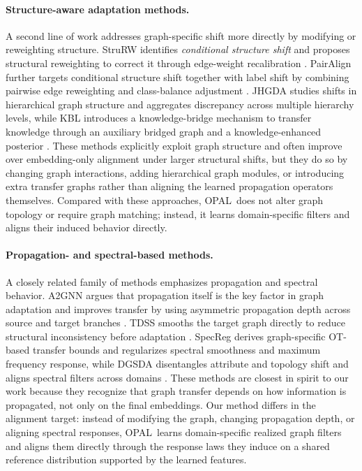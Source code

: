 \documentclass[runningheads]{llncs}
\newcommand{\model}{OPAL}
\begin{document}
\paragraph{Structure-aware adaptation methods.}
A second line of work addresses graph-specific shift more directly by modifying or reweighting structure. StruRW identifies \emph{conditional structure shift} and proposes structural reweighting to correct it through edge-weight recalibration \cite{stru_rw}. PairAlign further targets conditional structure shift together with label shift by combining pairwise edge reweighting and class-balance adjustment \cite{pair_align}. JHGDA studies shifts in hierarchical graph structure and aggregates discrepancy across multiple hierarchy levels, while KBL introduces a knowledge-bridge mechanism to transfer knowledge through an auxiliary bridged graph and a knowledge-enhanced posterior \cite{jhgda,kbl}. These methods explicitly exploit graph structure and often improve over embedding-only alignment under larger structural shifts, but they do so by changing graph interactions, adding hierarchical graph modules, or introducing extra transfer graphs rather than aligning the learned propagation operators themselves. Compared with these approaches, \model\ does not alter graph topology or require graph matching; instead, it learns domain-specific filters and aligns their induced behavior directly.

\paragraph{Propagation- and spectral-based methods.}
A closely related family of methods emphasizes propagation and spectral behavior. A2GNN argues that propagation itself is the key factor in graph adaptation and improves transfer by using asymmetric propagation depth across source and target branches \cite{a2gnn}. TDSS smooths the target graph directly to reduce structural inconsistency before adaptation \cite{tdss}. SpecReg derives graph-specific OT-based transfer bounds and regularizes spectral smoothness and maximum frequency response, while DGSDA disentangles attribute and topology shift and aligns spectral filters across domains \cite{specreg,dgsda}. These methods are closest in spirit to our work because they recognize that graph transfer depends on how information is propagated, not only on the final embeddings. Our method differs in the alignment target: instead of modifying the graph, changing propagation depth, or aligning spectral responses, \model\ learns domain-specific realized graph filters and aligns them directly through the response laws they induce on a shared reference distribution supported by the learned features.
\end{document}
